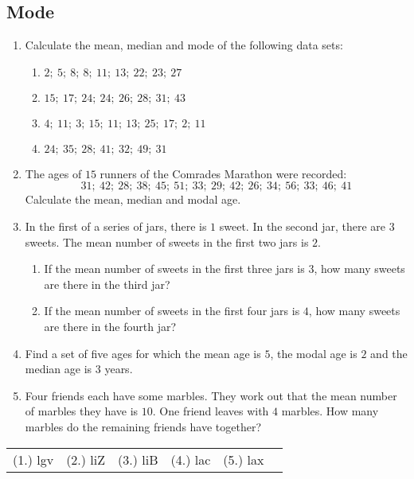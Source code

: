\subsection{Mode}
\begin{exercises}{}{
    \begin{enumerate}[noitemsep, label=\textbf{\arabic*}.]
    \item Calculate the mean, median and mode of the following data sets:
      \begin{enumerate}[noitemsep, label=\textbf{(\alph*)} ]
      \item $2;~5;~8;~8;~11;~13;~22;~23;~27$
      \item $15;~17;~24;~24;~26;~28;~31;~43$
      \item $4;~11;~3;~15;~11;~13;~25;~17;~2;~11$
      \item $24;~35;~28;~41;~32;~49;~31$
      \end{enumerate}
    \item The ages of $15$ runners of the Comrades Marathon were recorded:
      \begin{equation*}
        31;~42;~28;~38;~45;~51;~33;~29;~42;~26;~34;~56;~33;~46;~41
      \end{equation*}
      Calculate the mean, median and modal age.
    \item In the first of a series of jars, there is $1$ sweet. In the
      second jar, there are $3$ sweets. The mean number of sweets in the
      first two jars is $2$.
      \begin{enumerate}[noitemsep, label=\textbf{(\alph*)} ]
      \item If the mean number of sweets in the first three jars is $3$, how
        many sweets are there in the third jar?
      \item If the mean number of sweets in the first four jars is $4$, how
        many sweets are there in the fourth jar?
      \end{enumerate}
    \item Find a set of five ages for which the mean age is $5$, the modal
      age is $2$ and the median age is $3$ years.
    \item Four friends each have some marbles. They work out that the mean
      number of marbles they have is $10$. One friend leaves with $4$
      marbles. How many marbles do the remaining friends have together?
    \end{enumerate}
\practiceinfo
\par 
\par \begin{tabular}[h]{cccccc}
(1.) lgv  &  (2.) liZ  &  (3.) liB  &  (4.) lac  &  (5.) lax \end{tabular}
}
\end{exercises}


